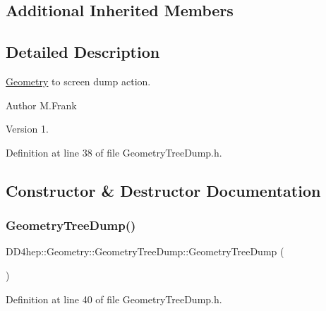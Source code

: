 \subsection*{Additional Inherited Members}


\subsection{Detailed Description}
\hyperlink{namespace_d_d4hep_1_1_geometry}{Geometry} to screen dump action. 

\begin{DoxyAuthor}{Author}
M.\+Frank 
\end{DoxyAuthor}
\begin{DoxyVersion}{Version}
1. 
\end{DoxyVersion}


Definition at line 38 of file Geometry\+Tree\+Dump.\+h.



\subsection{Constructor \& Destructor Documentation}
\hypertarget{class_d_d4hep_1_1_geometry_1_1_geometry_tree_dump_a47f8f93072e4f019169b6f7853c4cb77}{}\label{class_d_d4hep_1_1_geometry_1_1_geometry_tree_dump_a47f8f93072e4f019169b6f7853c4cb77} 
\subsubsection{\texorpdfstring{Geometry\+Tree\+Dump()}{GeometryTreeDump()}}
{\footnotesize\ttfamily D\+D4hep\+::\+Geometry\+::\+Geometry\+Tree\+Dump\+::\+Geometry\+Tree\+Dump (\begin{DoxyParamCaption}{ }\end{DoxyParamCaption})\hspace{0.3cm}{\ttfamily [inline]}}



Definition at line 40 of file Geometry\+Tree\+Dump.\+h.

\hypertarget{class_d_d4hep_1_1_geometry_1_1_geometry_tree_dump_a3d194c9411bf2c915462a3f086d6b8f5}{}\label{class_d_d4hep_1_1_geometry_1_1_geometry_tree_dump_a3d194c9411bf2c915462a3f086d6b8f5} 

